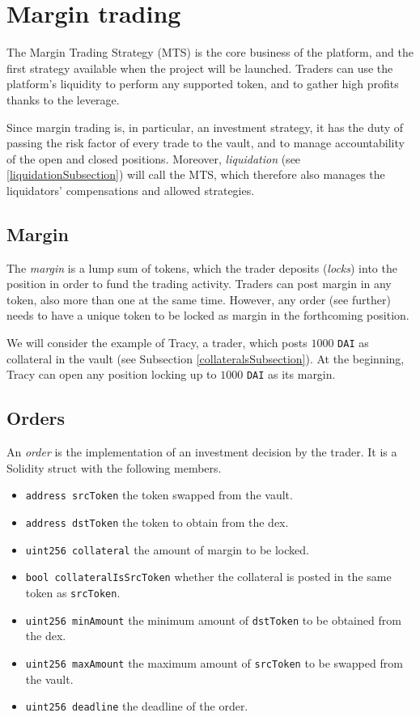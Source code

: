 \documentclass [10pt, fancyhdr, twoside] {article}
\begin{document}
\section{Margin trading}\label{marginTradingSection}

The Margin Trading Strategy (MTS) is the core business of the platform, and the first strategy available when the project will be launched. Traders can use the platform's liquidity to perform any supported token, and to gather high profits thanks to the leverage.

Since margin trading is, in particular, an investment strategy, it has the duty of passing the risk factor of every trade to the vault, and to manage accountability of the open and closed positions. Moreover, \emph{liquidation} (see \ref{liquidationSubsection}) will call the MTS, which therefore also manages the liquidators' compensations and allowed strategies.

\subsection{Margin}
The \textit{margin} is a lump sum of tokens, which the trader deposits (\textit{locks}) into the position in order to fund the trading activity. Traders can post margin in any token, also more than one at the same time. However, any order (see further) needs to have a unique token to be locked as margin in the forthcoming position.

We will consider the example of Tracy, a trader, which posts $1000$ \verb|DAI| as collateral in the vault (see Subsection \ref{collateralsSubsection}). At the beginning, Tracy can open any position locking up to $1000$ \verb|DAI| as its margin.

\subsection{Orders}\label{orderSubsection}
An \textit{order} is the implementation of an investment decision by the trader. It is a Solidity struct with the following members.
\begin{itemize}
\item \verb|address srcToken| the token swapped from the vault.
\item \verb|address dstToken| the token to obtain from the dex.
\item \verb|uint256 collateral| the amount of margin to be locked.
\item \verb|bool collateralIsSrcToken| whether the collateral is posted in the same token as \verb|srcToken|.
\item \verb|uint256 minAmount| the minimum amount of \verb|dstToken| to be obtained from the dex.
\item \verb|uint256 maxAmount| the maximum amount of \verb|srcToken| to be swapped from the vault.
\item \verb|uint256 deadline| the deadline of the order.
\end{itemize}
\end{document}
